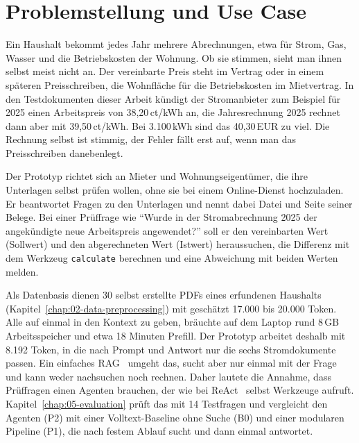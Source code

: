 
\chapter{Problemstellung und Use Case}
\label{chap:01-problem-use-case}


Ein Haushalt bekommt jedes Jahr mehrere Abrechnungen, etwa für Strom, Gas, Wasser und die Betriebskosten der Wohnung. Ob sie stimmen, sieht man ihnen selbst meist nicht an. Der vereinbarte Preis steht im Vertrag oder in einem späteren Preisschreiben, die Wohnfläche für die Betriebskosten im Mietvertrag. In den Testdokumenten dieser Arbeit kündigt der Stromanbieter zum Beispiel für 2025 einen Arbeitspreis von 38,20\,ct/kWh an, die Jahresrechnung 2025 rechnet dann aber mit 39,50\,ct/kWh. Bei 3.100\,kWh sind das 40,30\,EUR zu viel. Die Rechnung selbst ist stimmig, der Fehler fällt erst auf, wenn man das Preisschreiben danebenlegt.

Der Prototyp richtet sich an Mieter und Wohnungseigentümer, die ihre Unterlagen selbst prüfen wollen, ohne sie bei einem Online-Dienst hochzuladen. Er beantwortet Fragen zu den Unterlagen und nennt dabei Datei und Seite seiner Belege. Bei einer Prüffrage wie \enquote{Wurde in der Stromabrechnung 2025 der angekündigte neue Arbeitspreis angewendet?} soll er den vereinbarten Wert (Sollwert) und den abgerechneten Wert (Istwert) heraussuchen, die Differenz mit dem Werkzeug \texttt{calculate} berechnen und eine Abweichung mit beiden Werten melden.

Als Datenbasis dienen 30 selbst erstellte PDFs eines erfundenen Haushalts (Kapitel~\ref{chap:02-data-preprocessing}) mit geschätzt 17.000 bis 20.000 Token. Alle auf einmal in den Kontext zu geben, bräuchte auf dem Laptop rund 8\,GB Arbeitsspeicher und etwa 18 Minuten Prefill. Der Prototyp arbeitet deshalb mit 8.192 Token, in die nach Prompt und Antwort nur die sechs Stromdokumente passen. Ein einfaches RAG~\cite{gao2023survey} umgeht das, sucht aber nur einmal mit der Frage und kann weder nachsuchen noch rechnen. Daher lautete die Annahme, dass Prüffragen einen Agenten brauchen, der wie bei ReAct~\cite{yao2023react} selbst Werkzeuge aufruft. Kapitel~\ref{chap:05-evaluation} prüft das mit 14 Testfragen und vergleicht den Agenten (P2) mit einer Volltext-Baseline ohne Suche (B0) und einer modularen Pipeline (P1), die nach festem Ablauf sucht und dann einmal antwortet.

